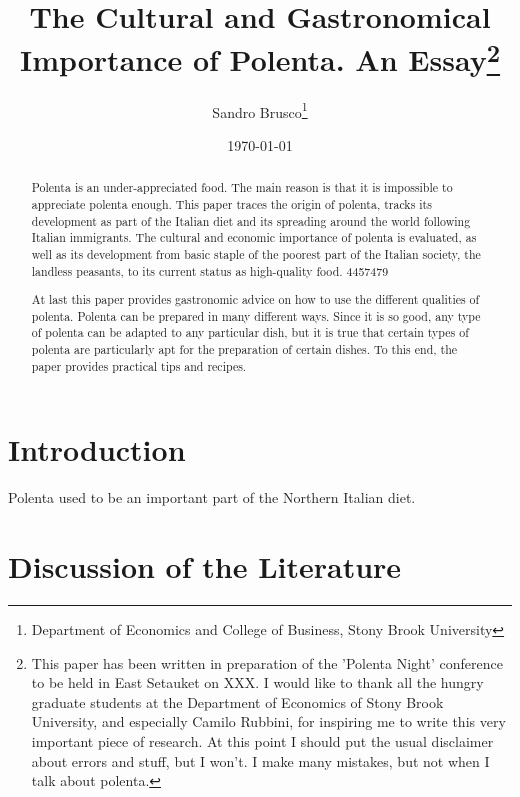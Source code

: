 \documentclass[12pt]{article}
\begin{document}
\author{\setcounter{footnote}{3} Sandro Brusco\thanks{
Department of Economics and College of Business, Stony Brook University}}
\title{The Cultural and Gastronomical Importance of Polenta. An Essay\thanks{
This paper has been written in preparation of the 'Polenta Night' conference to be held in East Setauket on XXX. I would like to thank all the hungry graduate students at the Department of Economics of Stony Brook  University, and especially Camilo Rubbini, for inspiring me to write this very important piece of research. At this point I should put the usual disclaimer about errors and stuff, but I won't. I make many mistakes, but not when I talk about polenta.}}
\date{\today }
\maketitle

\begin{abstract}
Polenta is an under-appreciated food. The main reason is that it is impossible to appreciate polenta enough. This paper traces the origin of polenta, tracks its development as part of the Italian diet and its spreading around the world following Italian immigrants. The cultural and economic importance of polenta is evaluated, as well as its development from basic staple of the poorest part of the Italian society, the landless peasants, to its current status as high-quality food. 4457479

At last this paper provides gastronomic advice on how to use the different qualities of polenta. Polenta can be prepared in many different ways. Since it is so good, any type of polenta can be adapted to any particular dish, but it is true that certain types of polenta are particularly apt for the preparation of certain dishes. To this end, the paper provides practical tips and recipes.
\end{abstract}

\newpage

\section{Introduction}

\label{introduction} Polenta used to be an important part of the Northern Italian diet.

\section{Discussion of the Literature}
\end{document}
